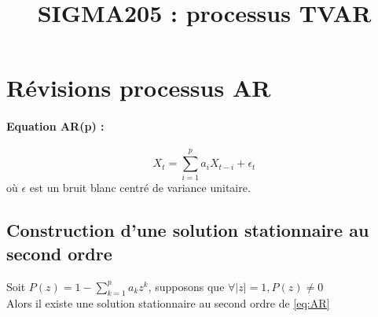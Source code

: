 \documentclass[a4paper,french]{article}
\title{SIGMA205 : processus TVAR}
\date{}
\begin{document}
\maketitle
\section{Révisions processus AR}
\paragraph{Equation AR(p) :} 
\begin{equation}\label{eq:AR}
X_t = \sum_{i=1}^p a_i X_{t-i} + \epsilon_t
\tag{AR}
\end{equation}
où $\epsilon$ est un bruit blanc centré de variance unitaire.
\subsection{Construction d'une solution stationnaire au second ordre}
\begin{Thm}
Soit $P(z)=1-\sum_{k=1}^p a_k z^k$, supposons que $\forall |z|=1, P(z)\neq 0$ \\
Alors il existe une solution stationnaire au second ordre de \eqref{eq:AR} 
\end{Thm}
\end{document}
